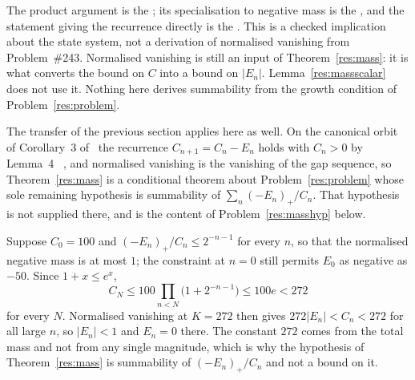 \noindent The product argument is the
; its specialisation to negative mass is the
, and the statement giving the recurrence directly is
the
.  This is a checked implication about
the state system, not a derivation of normalised vanishing from
Problem~\#243.  Normalised vanishing is still an input of
Theorem~\ref{res:mass}: it is what converts the bound on $C$ into a bound on
$|E_n|$.  Lemma~\ref{res:massscalar} does not use it.  Nothing here derives
summability from the growth condition of Problem~\ref{res:problem}.

The transfer of the previous section applies here as well.  On the canonical
orbit of Corollary~3 of~\cite[p.~9]{koizumi2025} the recurrence
$C_{n+1}=C_n-E_n$ holds with $C_n>0$ by Lemma~4
~\cite[p.~11]{koizumi2025}, and normalised vanishing is the vanishing of
the gap sequence, so Theorem~\ref{res:mass} is a conditional theorem about
Problem~\ref{res:problem} whose sole remaining hypothesis is summability of
$\sum_n(-E_n)_+/C_n$.  That hypothesis is not supplied there, and is the
content of Problem~\ref{res:masshyp} below.

\begin{example}\label{ex:mass}
Suppose $C_0=100$ and $(-E_n)_+/C_n\le2^{-n-1}$ for every $n$, so that the
normalised negative mass is at most $1$; the constraint at $n=0$ still permits
$E_0$ as negative as $-50$.  Since $1+x\le e^{x}$,
\[
 C_N\le100\prod_{n<N}\bigl(1+2^{-n-1}\bigr)\le100e<272
\]
for every $N$.  Normalised vanishing at $K=272$ then gives
$272|E_n|<C_n<272$ for all large $n$, so $|E_n|<1$ and $E_n=0$ there.  The
constant $272$ comes from the total mass and not from any single magnitude,
which is why the hypothesis of Theorem~\ref{res:mass} is summability of
$(-E_n)_+/C_n$ and not a bound on it.
\end{example}

